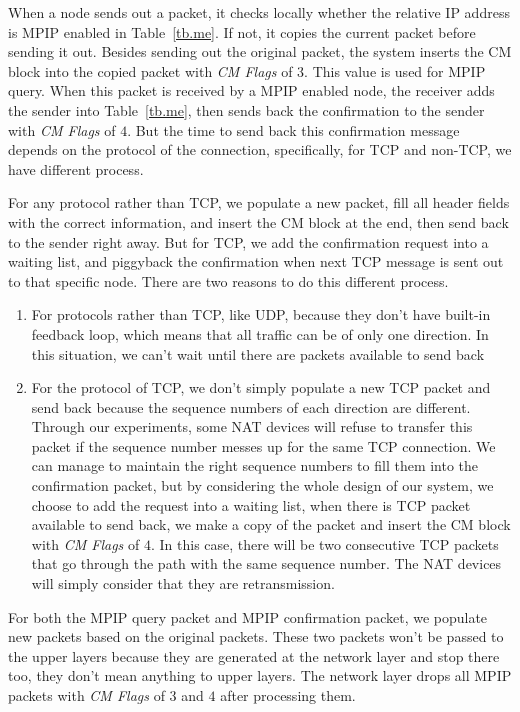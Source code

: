 When a node sends out a packet, it checks locally whether the relative IP address is MPIP enabled in Table~\ref{tb.me}. If not, it 
copies the current packet before sending it out. Besides sending out the original packet, the system inserts the CM block into the copied packet with \emph{CM Flags} of $3$. This value is used for MPIP query. When this packet is received by a MPIP enabled node, the receiver adds the sender into Table~\ref{tb.me}, then sends back the confirmation to the sender with \emph{CM Flags} of $4$. But the time to send back this confirmation message depends on the protocol of the connection, specifically, for TCP and non-TCP, we have different process. 

For any protocol rather than TCP, we populate a new packet, fill all header fields with the correct information, and insert the CM block at the end, then send back to the sender right away. But for TCP, we add the confirmation request into a waiting list, and piggyback the confirmation when next TCP message is sent out to that specific node. There are two reasons to do this different process. 

\begin{enumerate}
\item For protocols rather than TCP, like UDP, because they don't have built-in feedback loop, which means that all traffic can be of only one direction. In this situation, we can't wait until there are packets available to send back 

\item For the protocol of TCP, we don't simply populate a new TCP packet and send back because the sequence numbers of each direction are different. Through our experiments, some NAT devices will refuse to transfer this packet if the sequence number messes up for the same TCP connection. We can manage to maintain the right sequence numbers to fill them into the confirmation packet, but by considering the whole design of our system, we choose to add the request into a waiting list, when there is TCP packet available to send back, we make a copy of the packet and insert the CM block with \emph{CM Flags} of $4$. In this case, there will be two consecutive TCP packets that go through the path with the same sequence number. The NAT devices will simply consider that they are retransmission.
\end{enumerate}

For both the MPIP query packet and MPIP confirmation packet, we populate new packets based on the original packets. These two packets won't be passed to the upper layers because they are generated at the network layer and stop there too, they don't mean anything to upper layers. The network layer drops all MPIP packets with \emph{CM Flags} of $3$ and $4$ after processing them.


